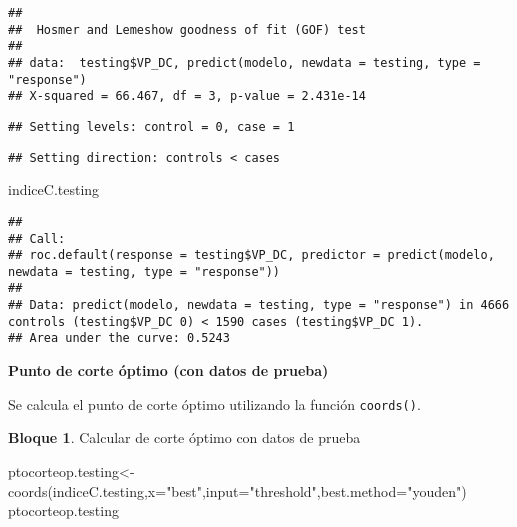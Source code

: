\documentclass[
]{book}
\newenvironment{Shaded}{\begin{snugshade}}{\end{snugshade}}
\newcommand{\AttributeTok}[1]{\textcolor[rgb]{0.77,0.63,0.00}{#1}}
\newcommand{\CommentTok}[1]{\textcolor[rgb]{0.56,0.35,0.01}{\textit{#1}}}
\newcommand{\FunctionTok}[1]{\textcolor[rgb]{0.00,0.00,0.00}{#1}}
\newcommand{\NormalTok}[1]{#1}
\newcommand{\OtherTok}[1]{\textcolor[rgb]{0.56,0.35,0.01}{#1}}
\newcommand{\SpecialCharTok}[1]{\textcolor[rgb]{0.00,0.00,0.00}{#1}}
\newcommand{\StringTok}[1]{\textcolor[rgb]{0.31,0.60,0.02}{#1}}
\theoremstyle{definition}
\theoremstyle{definition}
\newtheorem{example}{Bloque}[chapter]
\theoremstyle{definition}
\theoremstyle{definition}
\theoremstyle{remark}
\begin{document}
\begin{verbatim}
## 
##  Hosmer and Lemeshow goodness of fit (GOF) test
## 
## data:  testing$VP_DC, predict(modelo, newdata = testing, type = "response")
## X-squared = 66.467, df = 3, p-value = 2.431e-14
\end{verbatim}

\begin{Shaded}
\end{Shaded}

\begin{verbatim}
## Setting levels: control = 0, case = 1
\end{verbatim}

\begin{verbatim}
## Setting direction: controls < cases
\end{verbatim}

\begin{Shaded}
\begin{Highlighting}[]
\NormalTok{indiceC.testing}
\end{Highlighting}
\end{Shaded}

\begin{verbatim}
## 
## Call:
## roc.default(response = testing$VP_DC, predictor = predict(modelo,     newdata = testing, type = "response"))
## 
## Data: predict(modelo, newdata = testing, type = "response") in 4666 controls (testing$VP_DC 0) < 1590 cases (testing$VP_DC 1).
## Area under the curve: 0.5243
\end{verbatim}

\textbf{Punto de corte óptimo (con datos de prueba)}

Se calcula el punto de corte óptimo utilizando la función \texttt{coords()}.

\begin{example}
\protect\hypertarget{exm:bloque88nbm}{}\label{exm:bloque88nbm}Calcular de corte óptimo con datos de prueba
\end{example}

\begin{Shaded}
\begin{Highlighting}[]
\NormalTok{ptocorteop.testing}\OtherTok{\textless{}{-}}\FunctionTok{coords}\NormalTok{(indiceC.testing,}\AttributeTok{x=}\StringTok{"best"}\NormalTok{,}\AttributeTok{input=}\StringTok{"threshold"}\NormalTok{,}\AttributeTok{best.method=}\StringTok{"youden"}\NormalTok{)}
\NormalTok{ptocorteop.testing}
\end{Highlighting}
\end{Shaded}
\end{document}
